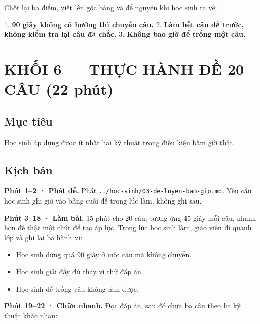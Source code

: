\documentclass[11pt, a4paper]{article}
\begin{document}
Chốt lại ba điểm, viết lên góc bảng và để nguyên khi học sinh ra về:

1. \textbf{90 giây không có hướng thì chuyển câu.}
2. \textbf{Làm hết câu dễ trước, không kiểm tra lại câu đã chắc.}
3. \textbf{Không bao giờ để trống một câu.}

\section{KHỐI 6 — THỰC HÀNH ĐỀ 20 CÂU (22 phút)}

\subsection{Mục tiêu}

Học sinh áp dụng được ít nhất hai kỹ thuật trong điều kiện bấm giờ thật.

\subsection{Kịch bản}

\textbf{Phút 1–2 · Phát đề.} Phát \texttt{../hoc-sinh/03-de-luyen-bam-gio.md}. Yêu cầu học sinh ghi giờ vào bảng cuối đề trong lúc làm, không ghi sau.

\textbf{Phút 3–18 · Làm bài.} 15 phút cho 20 câu, tương ứng 45 giây mỗi câu, nhanh hơn đề thật một chút để tạo áp lực. Trong lúc học sinh làm, giáo viên đi quanh lớp và ghi lại ba hành vi:

\begin{itemize}[leftmargin=1.4em, itemsep=2pt]
\item Học sinh dừng quá 90 giây ở một câu mà không chuyển.
\item Học sinh giải đầy đủ thay vì thử đáp án.
\item Học sinh để trống câu không làm được.
\end{itemize}

\textbf{Phút 19–22 · Chữa nhanh.} Đọc đáp án, sau đó chữa ba câu theo ba kỹ thuật khác nhau:

\end{document}
